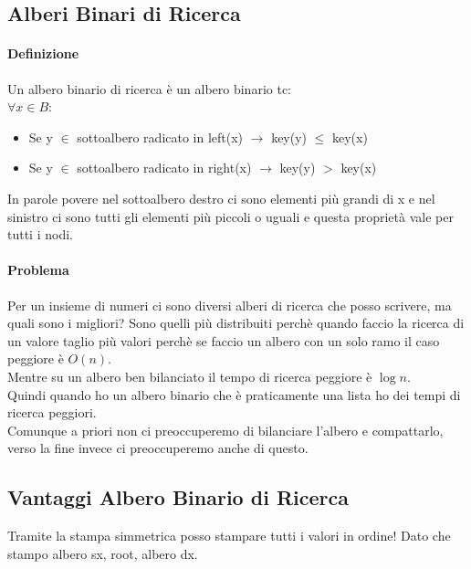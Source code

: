 \subsection{Alberi Binari di Ricerca}
\paragraph*{Definizione} Un albero binario di ricerca è un albero binario tc:\\
$\forall x \in B$:\\
\begin{itemize}
    \item Se y $\in$ sottoalbero radicato in left(x) $\rightarrow$ key(y) $\leq$ key(x)
    \item Se y $\in$ sottoalbero radicato in right(x) $\rightarrow$ key(y) $>$ key(x)
\end{itemize}
In parole povere nel sottoalbero destro ci sono elementi più grandi di x e nel sinistro ci sono 
tutti gli elementi più piccoli o uguali e questa proprietà vale per tutti i nodi.
\paragraph*{Problema} Per un insieme di numeri ci sono diversi alberi di ricerca che posso scrivere,
ma quali sono i migliori? Sono quelli più distribuiti perchè quando faccio la ricerca di un
valore taglio più valori perchè se faccio un albero con un solo ramo il caso peggiore è $O(n)$.\\
Mentre su un albero ben bilanciato il tempo di ricerca peggiore è $\log n$.\\
Quindi quando ho un albero binario che è praticamente una lista ho dei tempi di ricerca peggiori.\\
Comunque a priori non ci preoccuperemo di bilanciare l'albero e compattarlo, verso la fine invece
ci preoccuperemo anche di questo.
\subsection{Vantaggi Albero Binario di Ricerca}
Tramite la stampa simmetrica posso stampare tutti i valori in ordine! Dato
che stampo albero sx, root, albero dx.
